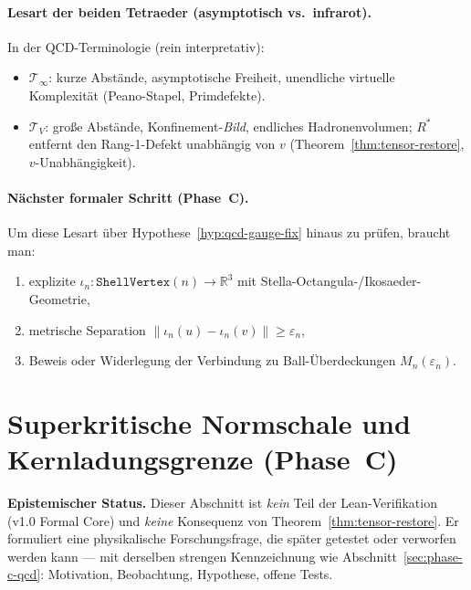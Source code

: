 \documentclass[11pt,a4paper]{article}
\begin{document}
	\paragraph{Lesart der beiden Tetraeder (asymptotisch vs.\ infrarot).}
	In der QCD-Terminologie (rein interpretativ):
	\begin{itemize}
		\item $\mathcal{T}_\infty$: kurze Abstände, asymptotische Freiheit, unendliche
		virtuelle Komplexität (Peano-Stapel, Primdefekte).
		\item $\mathcal{T}_V$: große Abstände, Konfinement-\emph{Bild}, endliches Hadronenvolumen;
		$R^*$ entfernt den Rang-1-Defekt unabhängig von $v$
		(Theorem~\ref{thm:tensor-restore}, $v$-Unabhängigkeit).
	\end{itemize}
	
	\paragraph{Nächster formaler Schritt (Phase~C).}
	Um diese Lesart über Hypothese~\ref{hyp:qcd-gauge-fix} hinaus zu prüfen, braucht man:
	\begin{enumerate}
		\item explizite $\iota_n:\texttt{ShellVertex}(n)\to\mathbb{R}^3$ mit Stella-Octangula-/Ikosaeder-Geometrie,
		\item metrische Separation $\| \iota_n(u)-\iota_n(v)\|\ge\varepsilon_n$,
		\item Beweis oder Widerlegung der Verbindung zu Ball-Überdeckungen $M_n(\varepsilon_n)$.
	\end{enumerate}
	
	\section{Superkritische Normschale und Kernladungsgrenze (Phase~C)}
	\label{sec:phase-c-supercritical}
	
	\textbf{Epistemischer Status.}
	Dieser Abschnitt ist \emph{kein} Teil der Lean-Verifikation (v1.0 Formal Core)
	und \emph{keine} Konsequenz von Theorem~\ref{thm:tensor-restore}.
	Er formuliert eine physikalische Forschungsfrage, die später getestet oder
	verworfen werden kann --- mit derselben strengen Kennzeichnung wie
	Abschnitt~\ref{sec:phase-c-qcd}: Motivation, Beobachtung, Hypothese, offene Tests.
	
\end{document}
